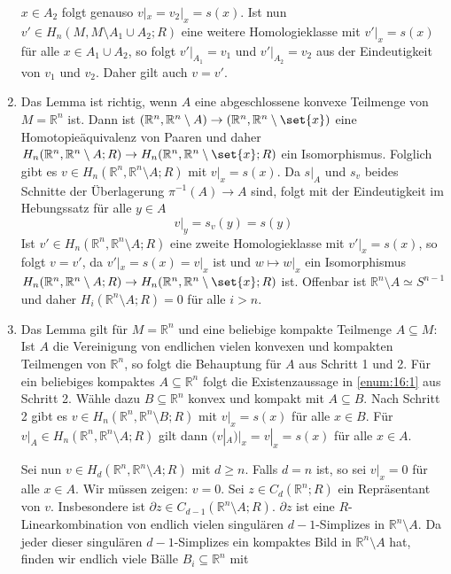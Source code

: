 \begin{beweis}
\begin{enumerate}[label=\textbf{Schritt \arabic*:},wide=0cm]
		$x \in A_2$ folgt genauso $v|_x = v_2|_x =s(x)$. Ist nun $v' \in H_n(M,M \setminus A_1 \cup A_2;R)$ eine weitere Homologieklasse mit $v'|_x=s(x)$ für alle 
		$x \in A_1 \cup A_2$, so folgt $v'|_{A_1}=v_1$ und $v'|_{A_2}=v_2$ aus der Eindeutigkeit von $v_1$ und $v_2$. Daher gilt auch $v=v'$.
		\item Das Lemma ist richtig, wenn $A$ eine abgeschlossene konvexe Teilmenge von $M=\mathbb{R}^n$ ist. Dann ist 
		$(\mathbb{R}^n, \mathbb{R}^n \setminus A) \to (\mathbb{R}^n, \mathbb{R}^n \setminus \set{x})$ eine Homotopieäquivalenz von Paaren und daher 
		$H_n(\mathbb{R}^n, \mathbb{R}^n \setminus A;R) \to H_n(\mathbb{R}^n,\mathbb{R}^n \setminus \set{x};R)$ ein Isomorphismus. Folglich gibt es 
		$v \in H_n(\mathbb{R}^n,\mathbb{R}^n \setminus A;R)$ mit $v|_x=s(x)$. Da $s|_A$ und $s_v$ beides Schnitte der Überlagerung $\pi ^{-1}(A) \to A$ sind, folgt mit der
		Eindeutigkeit im Hebungssatz für alle $y \in A$
		\[
			v\big|_y = s_v(y) = s(y)
		\]
		Ist $v' \in H_n(\mathbb{R}^n, \mathbb{R}^n \setminus A;R)$ eine zweite Homologieklasse mit $v'|_x=s(x)$, so folgt $v=v'$, da $v'|_x =s(x)=v|_x$ ist und $w \mapsto w|_x$
		ein Isomorphismus $H_n(\mathbb{R}^n,\mathbb{R}^n \setminus A;R) \to H_n(\mathbb{R}^n, \mathbb{R}^n\setminus \set{x};R )$ ist. Offenbar ist 
		$\mathbb{R}^n \setminus A \simeq S^{n-1}$ und daher $H_i(\mathbb{R}^n \setminus A;R)=0$ für alle $i >n$.
		\item Das Lemma gilt für $M=\mathbb{R}^n$ und eine beliebige kompakte Teilmenge $A \subseteq M$: Ist $A$ die Vereinigung von endlichen vielen konvexen und kompakten 
		Teilmengen von $\mathbb{R}^n$, so folgt die Behauptung für $A$ aus Schritt 1 und 2. Für ein beliebiges kompaktes $A \subseteq \mathbb{R}^n$ folgt die Existenzaussage in 
		\ref{enum:16:1} aus Schritt 2. Wähle dazu $B \subseteq \mathbb{R}^n$ konvex und kompakt mit $A \subseteq B$. Nach Schritt 2 gibt es 
		$v \in H_n(\mathbb{R}^n, \mathbb{R}^n \setminus B;R)$ mit $v|_x=s(x)$ für alle $x \in B$. Für $v|_A \in H_n(\mathbb{R}^n,\mathbb{R}^n \setminus A;R)$ gilt dann 
		$(v|_A)\big|_x = v|_x=s(x)$ für alle $x \in A$.
	
		Sei nun $v \in H_d(\mathbb{R}^n,\mathbb{R}^n \setminus A;R)$ mit $d \ge n$. Falls $d=n$ ist, so sei $v|_x=0$ für alle $x \in A$. Wir müssen zeigen: $v=0$. Sei 
		$z \in C_d(\mathbb{R}^n;R)$ ein Repräsentant von $v$. Insbesondere ist $\partial z \in C_{d-1}(\mathbb{R}^n \setminus A;R)$. $\partial z$ ist eine 
		$R$-Linearkombination von endlich vielen singulären $d-1$-Simplizes in $\mathbb{R}^n \setminus A$. Da jeder dieser singulären $d-1$-Simplizes ein kompaktes Bild in 
		$\mathbb{R}^n \setminus A$ hat, finden wir endlich viele Bälle $B_i \subseteq \mathbb{R}^n$ mit
	

\end{enumerate}
\end{beweis}
